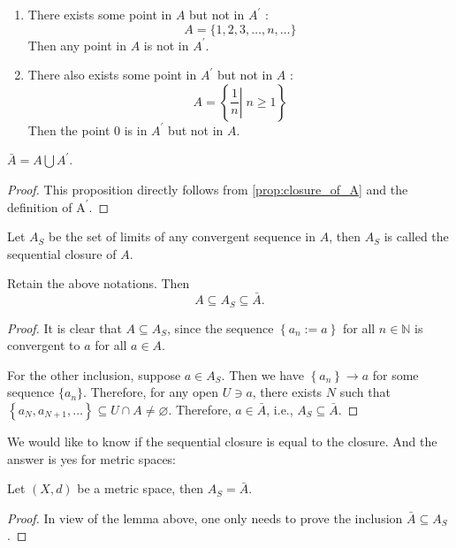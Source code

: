 \begin{example}
\begin{example}
\begin{enumerate}
    \item There exists some point in \(A\) but not in \({A}^{\prime}\) :
\[
A = \{ 1,2,3,\ldots,n,\ldots \}
\]
Then any point in \(A\) is not in \({A}^{\prime}\).

\item There also exists some point in \({A}^{\prime}\) but not in \(A\) :
\[
A = \left\{  {\left. \frac{1}{n}\right| \;n \geq  1}\right\}
\]
Then the point 0 is in \({A}^{\prime}\) but not in \(A\).
\end{enumerate} 
\end{example}

\begin{proposition} \(\bar{A} = A\bigcup {A}^{\prime}\).
\end{proposition}

\begin{proof} This proposition directly follows from \autoref{prop:closure_of_A} and the definition of \({\mathrm{A}}^{\prime}\).
\end{proof}

\begin{definition} Let \({A}_{S}\) be the set of limits of any convergent sequence in \(A\), then \({A}_{S}\) is called the sequential closure of \(A\).
\end{definition}

\begin{lemma}Retain the above notations. Then 
\[A \subseteq  {A}_{S} \subseteq  \bar{A}.\]
\end{lemma}
\begin{proof}
It is clear that \(A \subseteq  {A}_{S}\), since the sequence \(\left\{  {{a}_{n} := a}\right\}\) for all $n \in \mathbb{N}$ is convergent to \(a\) for all \(a \in  A\).

For the other inclusion, suppose \(a \in  {A}_{S}\). Then we have \(\left\{  {a}_{n}\right\} \rightarrow  a\) for some sequence $\{a_n\}$. Therefore, for any open \(U \ni  a\), there exists \(N\) such that \(\left\{  {{a}_{N},{a}_{N + 1},\ldots}\right\}   \subseteq  U \cap  A \neq  \varnothing\). Therefore, \(a \in  \bar{A}\), i.e., \({A}_{S} \subseteq  \bar{A}\).
\end{proof}


We would like to know if the sequential closure is equal to the closure. And the answer is yes for metric spaces:
\begin{proposition} Let $(X, d)$ be a metric space, then \({A}_{S} = \bar{A}\).
\end{proposition}
\begin{proof} In view of the lemma above, one only needs to prove the inclusion $\bar{A} \subseteq A_S$. 


\end{proof}
\end{example}
